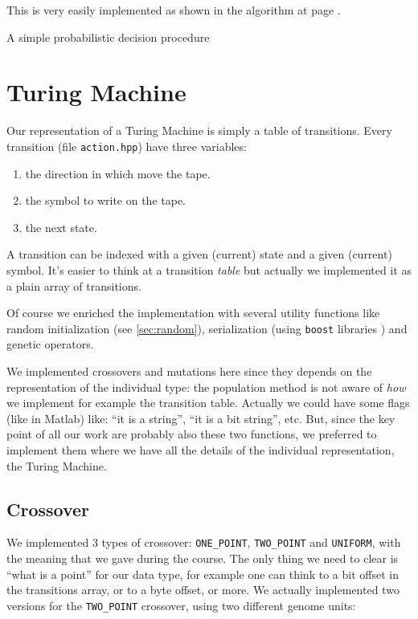 \documentclass{report}
\begin{document}
This is very easily implemented as shown in the algorithm at page \pageref{alg:decision}.

\begin{algorithm}[t]
\caption[Probabilistic decision]{A simple probabilistic decision procedure}
\label{alg:decision}

\end{algorithm}

\section{Turing Machine}
Our representation of a Turing Machine is simply a table of transitions. Every transition (file \texttt{action.hpp}) have three variables:
\begin{enumerate}
\item the direction in which move the tape.
\item the symbol to write on the tape.
\item the next state.
\end{enumerate}
A transition can be indexed with a given (current) state and a given (current) symbol. It's easier to think at a transition \textit{table} but actually we implemented it as a plain array of transitions.

Of course we enriched the implementation with several utility functions like random initialization (see \ref{sec:random}), serialization (using \texttt{boost} libraries \cite{boost-serialization}) and genetic operators.

We implemented crossovers and mutations here since they depends on the representation of the individual type: the population method is not aware of \textit{how} we implement for example the transition table. Actually we could have some flags (like in Matlab) like: ``it is a string'', ``it is a bit string'', etc. But, since the key point of all our work are probably also these two functions, we preferred to implement them where we have all the details of the individual representation, the Turing Machine.

\subsection{Crossover}
\label{sec:crossover}
We implemented 3 types of crossover: \texttt{ONE\_POINT}, \texttt{TWO\_POINT} and \texttt{UNIFORM}, with the meaning that we gave during the course. The only thing we need to clear is ``what is a point'' for our data type, for example one can think to a bit offset in the transitions array, or to a byte offset, or more.
We actually implemented two versions for the \texttt{TWO\_POINT} crossover, using two different genome units:
\end{document}
